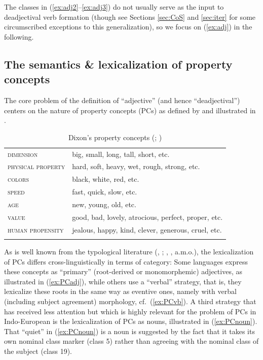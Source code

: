 \documentclass[output=paper,colorlinks,citecolor=brown]{langscibook}
\begin{document}
The classes in (\ref{ex:adj2}--\ref{ex:adj3}) do not usually serve as the input to deadjectival verb formation (though see Sections \ref{sec:CoS} and \ref{sec:iter} for some circumscribed exceptions to this generalization), so we focus on (\ref{ex:adj}) in the following. 





\subsection{The semantics \& lexicalization of property concepts}
\label{sec:lexicalization}

The core problem of the definition of ``adjective'' (and hence ``deadjectival'')  centers on the nature of property concepts (PCs) as defined by \citet{Dixon1982} and illustrated in .  


\begin{table}
\caption{Dixon's property concepts (\citealt[16]{Dixon1982}; \citealt[79]{Rau2009})}
\label{tab:PCs}
 \begin{tabularx}{.95\textwidth}{ll}
  \lsptoprule
   \textsc{dimension} & big, small, long, tall, short, etc.\\
      \textsc{physical property} & hard, soft, heavy, wet, rough, strong, etc.\\
       \textsc{colors} & black, white, red, etc.\\ 
        \textsc{speed} & fast, quick, slow, etc.\\
    \textsc{age} & new, young, old, etc.\\
   \textsc{value} & good, bad, lovely, atrocious, perfect, proper, etc.\\
  \textsc{human propensity} & jealous, happy, kind, clever, generous, cruel, etc.\\
  \lspbottomrule
 \end{tabularx}
\end{table}


As is well known from the typological literature (\citealt{Dixon1982}, \citeyear{Dixon2004}; \citealt{Thompson1989}, \citealt{Alfieri2014}, a.m.o.), the lexicalization of PCs differs cross-linguistically in terms of category: Some languages express these concepts as ``primary'' (root-derived or monomorphemic) adjectives, as illustrated in (\ref{ex:PCadj}),  while others use a ``verbal'' strategy, that is, they lexicalize these roots in the same way as eventive ones, namely with verbal (including subject agreement) morphology, cf.\ (\ref{ex:PCvb}). A third strategy that has received less attention but which is highly relevant for the problem of PCs in Indo-European is the lexicalization of PCs as nouns, illustrated in (\ref{ex:PCnoun}). That ``quiet'' in (\ref{ex:PCnoun}) is a noun is suggested by the fact that it takes its own nominal class marker (class 5) rather than agreeing with the nominal class of the subject (class 19). 
\end{document}
